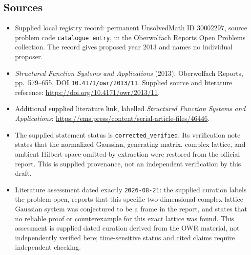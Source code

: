 \documentclass[11pt]{article}
\begin{document}
\subsection{Sources}
\begin{itemize}
\item Supplied local registry record: permanent UnsolvedMath ID \(30002297\), source problem code \texttt{catalogue entry}, in the Oberwolfach Reports Open Problems collection. The record gives proposed year 2013 and names no individual proposer.
\item \emph{Structured Function Systems and Applications} (2013), Oberwolfach Reports, pp.\ 579--655, DOI \texttt{10.4171/owr/2013/11}. Supplied source and literature reference: \url{https://doi.org/10.4171/owr/2013/11}.
\item Additional supplied literature link, labelled \emph{Structured Function Systems and Applications}: \url{https://ems.press/content/serial-article-files/46446}.
\item The supplied statement status is \texttt{corrected\_verified}. Its verification note states that the normalized Gaussian, generating matrix, complex lattice, and ambient Hilbert space omitted by extraction were restored from the official report. This is supplied provenance, not an independent verification by this draft.
\item Literature assessment dated exactly \texttt{2026-08-21}: the supplied curation labels the problem open, reports that this specific two-dimensional complex-lattice Gaussian system was conjectured to be a frame in the report, and states that no reliable proof or counterexample for this exact lattice was found. This assessment is supplied dated curation derived from the OWR material, not independently verified here; time-sensitive status and cited claims require independent checking.
\end{itemize}
\end{document}
